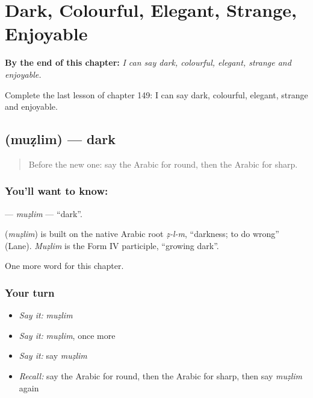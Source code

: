 
\chapter{Dark, Colourful, Elegant, Strange, Enjoyable}
\label{ch:ar-dark-colourful-elegant-strange-enjoyable}

\begin{chapteropening}
\textbf{By the end of this chapter:} \emph{I can say dark, colourful, elegant, strange and enjoyable.}

Complete the last lesson of chapter 149: I can say dark, colourful, elegant, strange and enjoyable.
\end{chapteropening}

\section[\texorpdfstring{\ar{مظلم} (muẓlim)}{مظلم (muẓlim)}]{ (muẓlim) — dark}

\label{lesson:AR-C149-muzlim}



\begin{quote}
Before the new one: say the Arabic for round, then the Arabic for sharp.
\end{quote}

\subsection*{You'll want to know: }
\textbf{} — \emph{muẓlim} — \textquotedblleft{}dark\textquotedblright{}.

\begin{cousinweb}
\textbf{} (\emph{muẓlim}) is built on the native Arabic root \emph{ẓ-l-m}, \textquotedblleft{}darkness; to do wrong\textquotedblright{} (Lane). \emph{Muẓlim} is the Form IV participle, \textquotedblleft{}growing dark\textquotedblright{}.
\end{cousinweb}

\begin{grammarlens}[title={What you've built}]
One more word for this chapter.
\end{grammarlens}

\subsection*{Your turn}
\begin{itemize}
\raggedright
  \item \emph{Say it:} \emph{muẓlim}
  \item \emph{Say it:} \emph{muẓlim}, once more
  \item \emph{Say it:} say \emph{muẓlim}
  \item \emph{Recall:} say the Arabic for round, then the Arabic for sharp, then say \emph{muẓlim} again
\end{itemize}

